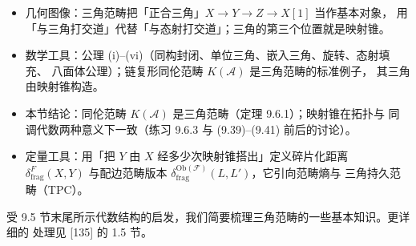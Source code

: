 \begin{keytakeaways}
\begin{itemize}
  \item 几何图像：三角范畴把「正合三角」$X\to Y\to Z\to X[1]$ 当作基本对象，
        用「与三角打交道」代替「与态射打交道」；三角的第三个位置就是映射锥。
  \item 数学工具：公理 (i)–(vi)（同构封闭、单位三角、嵌入三角、旋转、态射填充、
        八面体公理）；链复形同伦范畴 $K(\mathcal A)$ 是三角范畴的标准例子，
        其三角由映射锥构造。
  \item 本节结论：同伦范畴 $K(\mathcal A)$ 是三角范畴（定理 9.6.1）；映射锥在拓扑与
        同调代数两种意义下一致（练习 9.6.3 与 (9.39)–(9.41) 前后的讨论）。
  \item 定量工具：用「把 $Y$ 由 $X$ 经多少次映射锥搭出」定义碎片化距离
        $\delta^{F}_{\mathrm{frag}}(X,Y)$ 与配边范畴版本
        $\delta^{\mathrm{Ob}(\mathcal F)}_{\mathrm{frag}}(L,L')$，它引向范畴熵与
        三角持久范畴（TPC）。
\end{itemize}
\end{keytakeaways}

受 9.5 节末尾所示代数结构的启发，我们简要梳理三角范畴的一些基本知识。更详细的
处理见 [135] 的 1.5 节。

